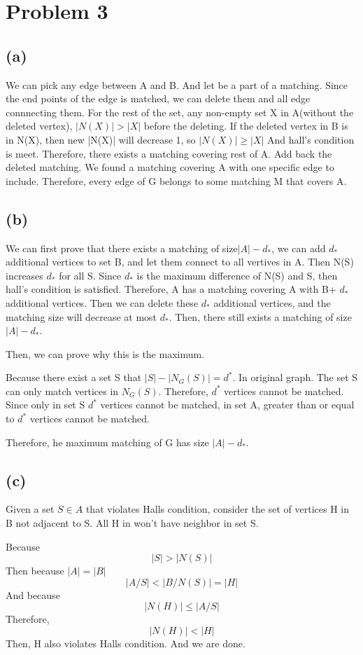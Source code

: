 \documentclass[11pt]{article}
\begin{document}
\section{Problem 3}
\subsection*{(a)}
We can pick any edge between A and B. And let be a part of a matching. Since the end points of the edge is matched, we can delete them and all edge connnecting them. For the rest of the set, any non-empty set X in A(without the deleted vertex), $|N(X)| > |X|$ before the deleting. If the deleted vertex in B is in N(X), then new |N(X)| will decrease 1, so $|N(X)| \ge |X|$ And hall's condition is meet. Therefore, there exists a matching covering rest of A. Add back the deleted matching.  We found a matching covering A with one specific edge to include. Therefore, every edge of G belongs to some matching M that covers A.

\subsection*{(b)}
We can first prove that there exists a matching of size$|A| - d_*$, we can add $d_* $ additional vertices to set B, and let them connect to all vertives in A. Then N(S) increases $d_*$ for all S. Since $d_*$ is the maximum difference of N(S) and S, then hall's condition is satisfied. Therefore, A has a matching covering A with B+ $d_*$ additional vertices. Then we can delete these $d_*$ additional vertices, and the matching size will decrease at most $d_*$. Then, there still exists a matching of size$|A| - d_*$.

Then, we can prove why this is the maximum. 

Because there exist a set S that $|S| - |N_G(S)| = d^*$. In original graph. The set S can only match vertices in $N_G(S)$. Therefore, $d^*$ vertices cannot be matched. Since only in set S $d^*$ vertices cannot be matched, in set A, greater than or equal to $d^*$ vertices cannot be matched.

Therefore, he maximum matching of G has size $|A| - d_*$.

\subsection*{(c)}

Given a set $S \in A$ that violates Halls condition, consider the set of vertices H in B not adjacent to S. All H in won't have neighbor in set S. 

Because $$|S|> |N(S)|$$
Then because $|A|=|B|$
$$|A/S| < |B/N(S)|=|H|$$
And because $$|N(H)|\le |A/S| $$
Therefore, $$|N(H)|< |H| $$
Then, H also violates Halls condition. And we are done.
\end{document}
